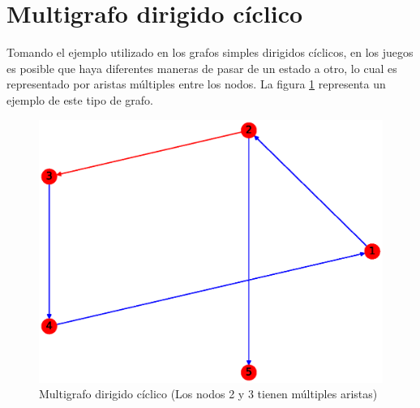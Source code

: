 \documentclass{article}
\begin{document}

\section{Multigrafo dirigido cíclico}
Tomando el ejemplo utilizado en los grafos simples dirigidos cíclicos, en los juegos es posible que haya diferentes maneras de pasar de un estado a otro, lo cual es representado por aristas múltiples entre los nodos. La figura \ref{fig:MDC} representa un ejemplo de este tipo de grafo.
\begin{figure}[h!]
    \includegraphics[width=\textwidth]{11-MDC}
    \caption{Multigrafo dirigido cíclico (Los nodos 2 y 3 tienen múltiples aristas)}
    \label{fig:MDC}
\end{figure}



\end{document}
